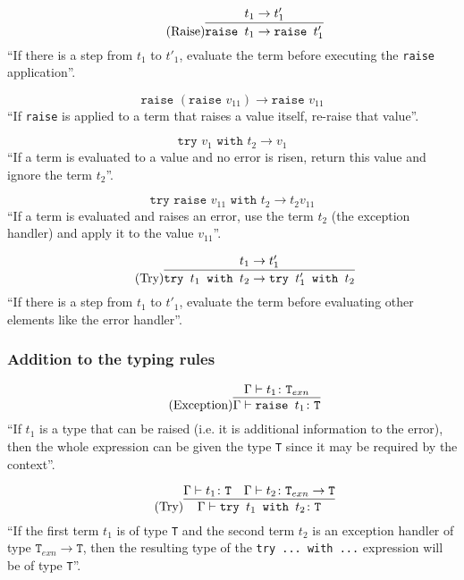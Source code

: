 \begin{equation*}
    \tag{Raise}
    \infer{
        \texttt{raise } t_1 \rightarrow \texttt{raise } t'_1
    }{
        t_1 \rightarrow t'_1
    }
\end{equation*}
``If there is a step from $t_1$ to $t'_1$, evaluate the term
before executing the \texttt{raise} application''.

\begin{equation*}
    \tag{Re-Raise}
    \texttt{raise } (\texttt{raise } v_{11}) \rightarrow \texttt{raise } v_{11}
\end{equation*}
``If \texttt{raise} is applied to a term that raises a value itself, re-raise that
value''.

\begin{equation*}
    \tag{Try Value}
    \texttt{try } v_1 \texttt{ with } t_2 \rightarrow v_1
\end{equation*}
``If a term is evaluated to a value and no error is risen, return
this value and ignore the term $t_2$''.

\begin{equation*}
    \tag{Try Error}
    \texttt{try } \texttt{raise } v_{11} \texttt{ with } t_2 \rightarrow t_2 v_{11}
\end{equation*}
``If a term is evaluated and raises an error, use the term $t_2$ (the exception
handler) and apply it to the value $v_{11}$''.

\begin{equation*}
    \tag{Try}
    \infer{
        \texttt{try } t_1 \texttt{ with } t_2 \rightarrow \texttt{try } t'_1 \texttt{ with } t_2
    }{
        t_1 \rightarrow t'_1
    }
\end{equation*}
``If there is a step from $t_1$ to $t'_1$, evaluate the term
before evaluating other elements like the error handler''.

\subsubsection{Addition to the typing rules \cite{pierce2002ProgLang}}
\begin{equation*}
    \tag{Exception}
    \infer{
        \Gamma \vdash \texttt{raise } t_1 \colon \texttt{T}
    }{
        \Gamma \vdash t_1 \colon \texttt{T}_{exn}
    }
\end{equation*}
``If $t_1$ is a type that can be raised (i.e. it is
additional information to the error), then the whole
expression can be given the type \texttt{T} since it may be required
by the context''.

\begin{equation*}
    \tag{Try}
    \infer{
        \Gamma \vdash \texttt{try } t_1 \texttt{ with } t_2 \colon \texttt{T}
    }{
        \Gamma \vdash t_1 \colon \texttt{T}
        &
        \Gamma \vdash t_2 \colon \texttt{T}_{exn} \rightarrow \texttt{T}
    }
\end{equation*}
``If the first term $t_1$ is of type \texttt{T} and the second
term $t_2$ is an exception handler of type $\texttt{T}_{exn} \rightarrow \texttt{T}$,
then the resulting type of the \texttt{try ... with ...} expression will
be of type \texttt{T}''.
